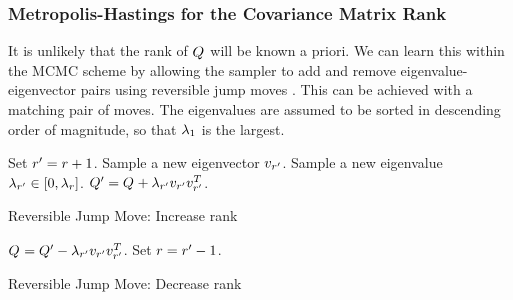 \documentclass[a4paper,10pt]{article}
\begin{document}
\subsubsection{Metropolis-Hastings for the Covariance Matrix Rank}

It is unlikely that the rank of $\lgtv$ will be known a priori. We can learn this within the MCMC scheme by allowing the sampler to add and remove eigenvalue-eigenvector pairs using reversible jump moves \cite{Green1995,Green2009}. This can be achieved with a matching pair of moves. The eigenvalues are assumed to be sorted in descending order of magnitude, so that $\lambda_{1}$ is the largest.

\begin{algorithm}
\begin{algorithmic}
 \REQUIRE{$\rk$, $\lgtv$}
 \STATE Set $r^{\prime} = r + 1$.
 \STATE Sample a new eigenvector $v_{r^{\prime}}$.
 \STATE Sample a new eigenvalue $\lambda_{r^{\prime}} \in [0,\lambda_{r}]$.
 \STATE $Q_{}^{\prime} = Q_{} + \lambda_{r^{\prime}}v_{r^{\prime}}v_{r^{\prime}}^{T}$.
 \RETURN{$\rk\mcnew$, $\lgtv\mcnew$}
\end{algorithmic}
\caption{Reversible Jump Move: Increase rank}
\label{alg:rjmcmc-up}
\end{algorithm}

\begin{algorithm}
\begin{algorithmic}
 \REQUIRE{$\rk\mcnew$, $\lgtv\mcnew$}
 \STATE $Q_{} = Q_{}^{\prime} - \lambda_{r^{\prime}}v_{r^{\prime}}v_{r^{\prime}}^{T}$.
 \STATE Set $r = r^{\prime} - 1$.
 \RETURN{$\rk$, $\lgtv$}
\end{algorithmic}
\caption{Reversible Jump Move: Decrease rank}
\label{alg:rjmcmc-down}
\end{algorithm}
\end{document}
